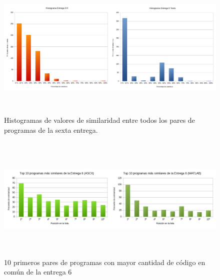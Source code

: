 \begin{figure}[H] %
\centering
\includegraphics[width=15cm, height=7cm]{imagenes/histograma6.png}  %
\caption{Histogramas de valores de similaridad entre todos los pares de programas de la sexta entrega.} \label{fig:histograma6}
\end{figure}



\begin{figure}[H] %
\centering
\includegraphics[width=14cm, height=6cm]{imagenes/TOP10_6.png}  %
\caption{10 primeros pares de programas con mayor cantidad de código en común de la entrega 6} \label{fig:TOP10_6}
\end{figure}

